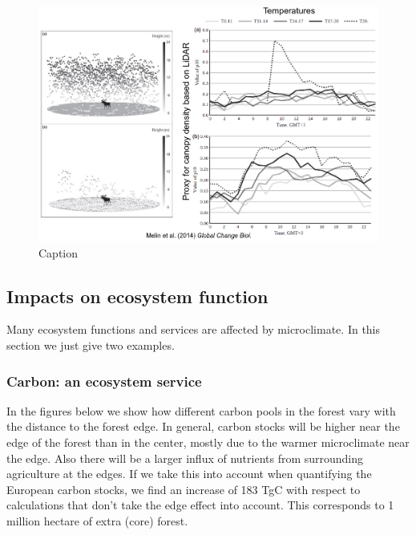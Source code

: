 \documentclass[12pt,oneside]{book}
\begin{document}
\begin{figure}

{\centering \includegraphics[width=1\linewidth]{figures/Figure1037} 

}

\caption{Caption}\label{fig:Micro37}
\end{figure}

\subsection{Impacts on ecosystem
function}\label{impacts-on-ecosystem-function}

Many ecosystem functions and services are affected by microclimate. In
this section we just give two examples.

\subsubsection{Carbon: an ecosystem
service}\label{carbon-an-ecosystem-service}

In the figures below we show how different carbon pools in the forest
vary with the distance to the forest edge. In general, carbon stocks
will be higher near the edge of the forest than in the center, mostly
due to the warmer microclimate near the edge. Also there will be a
larger influx of nutrients from surrounding agriculture at the edges. If
we take this into account when quantifying the European carbon stocks,
we find an increase of 183 TgC with respect to calculations that don't
take the edge effect into account. This corresponds to 1 million hectare
of extra (core) forest.
\end{document}
